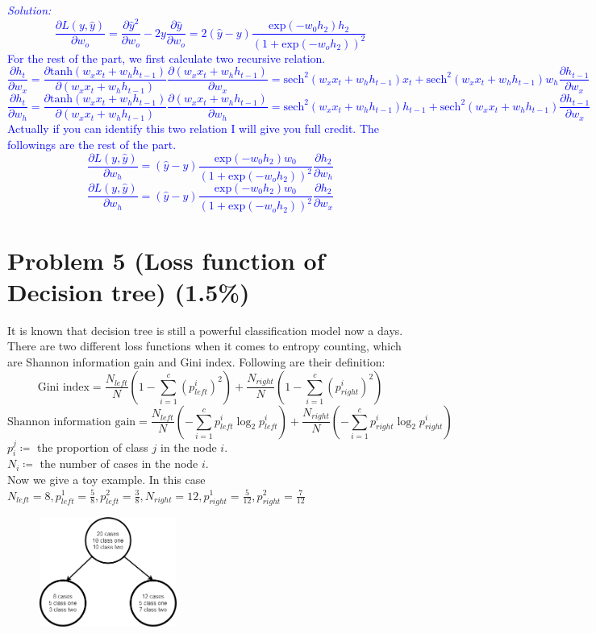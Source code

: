 \documentclass{article}
\def\solColor{blue}
\begin{document}
\textcolor{\solColor}{\textit{Solution:}
\[
\frac{\partial L(y, \hat{y})}{\partial w_o} = \frac{\partial \hat{y}^2}{\partial w_o} -2y\frac{\partial \hat{y}}{\partial w_o} = 2(\hat{y}-y)\frac{\text{exp}(-w_0h_2)h_2}{(1+\text{exp}(-w_o h_2))^2}
\]
For the rest of the part, we first calculate two recursive relation.
\[
\frac{\partial h_t}{\partial w_x} = \frac{\partial \text{tanh}(w_xx_t + w_hh_{t-1})}{\partial (w_xx_t + w_hh_{t-1})}\frac{\partial (w_xx_t + w_hh_{t-1})}{\partial w_x} = \text{sech}^2(w_xx_t + w_hh_{t-1})x_t + \text{sech}^2(w_xx_t + w_hh_{t-1})w_h\frac{\partial h_{t-1}}{\partial w_x}
\]
\[
\frac{\partial h_t}{\partial w_h} = \frac{\partial \text{tanh}(w_xx_t + w_hh_{t-1})}{\partial (w_xx_t + w_hh_{t-1})}\frac{\partial (w_xx_t + w_hh_{t-1})}{\partial w_h} = \text{sech}^2(w_xx_t + w_hh_{t-1})h_{t-1} + \text{sech}^2(w_xx_t + w_hh_{t-1})\frac{\partial h_{t-1}}{\partial w_x}
\]
Actually if you can identify this two relation I will give you full credit. The followings are the rest of the part.
\[
\frac{\partial L(y, \hat{y})}{\partial w_h} = (\hat{y}-y)\frac{\text{exp}(-w_0h_2)w_0}{(1+\text{exp}(-w_o h_2))^2}\frac{\partial h_2}{\partial w_h}
\]
\[
\frac{\partial L(y, \hat{y})}{\partial w_h} = (\hat{y}-y)\frac{\text{exp}(-w_0h_2)w_0}{(1+\text{exp}(-w_o h_2))^2}\frac{\partial h_2}{\partial w_x}
\]
}


\section*{Problem 5 (Loss function of Decision tree) (1.5\%)}
It is known that decision tree is still a powerful classification model now a days. There are two different loss functions when it comes to entropy counting, which are Shannon information gain and Gini index. Following are their definition:
\[
\text{Gini index} = \frac{N_{left}}{N}\left(1-\sum_{i=1}^c \left(p_{left}^i\right)^2\right) + \frac{N_{right}}{N}\left(1-\sum_{i=1}^c \left(p_{right}^i\right)^2\right)
\]
\[
\text{Shannon information gain} = \frac{N_{left}}{N}\left(-\sum_{i=1}^c p_{left}^i \log_2p_{left}^i\right) + \frac{N_{right}}{N}\left(-\sum_{i=1}^c p_{right}^i \log_2p_{right}^i\right)
\]
$p_i^j \coloneqq$ the proportion of class $j$ in the node $i$.\\
$N_i \coloneqq$ the number of cases in the node $i$.\\
Now we give a toy example. In this case $N_{left} = 8,p_{left}^1=\frac{5}{8},p_{left}^2=\frac{3}{8},N_{right}=12,p_{right}^1=\frac{5}{12},p_{right}^2=\frac{7}{12}$
\begin{figure}[h]
    \centering
    \includegraphics[width=0.4\textwidth]{ex_dt.png}
\end{figure}
\end{document}
